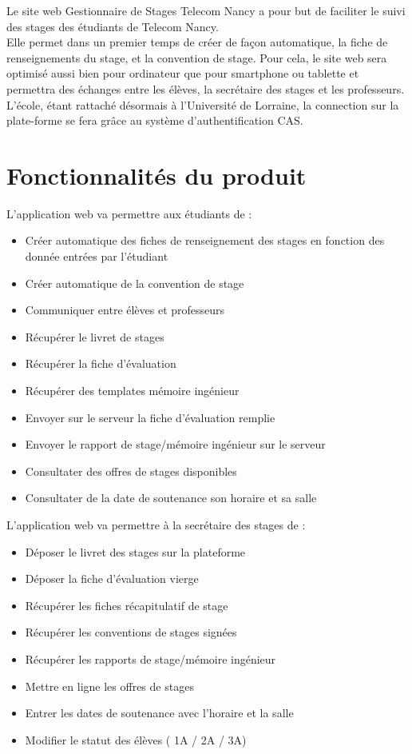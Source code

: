 \documentclass{scrreprt}
\begin{document}
\hspace{1cm}Le site web Gestionnaire de Stages Telecom Nancy a pour but de faciliter le suivi des stages des étudiants de Telecom Nancy.\\

\hspace{0.6cm}Elle permet dans un premier temps de créer de façon automatique, la fiche de renseignements du stage, et la convention de stage. Pour cela, le site web sera optimisé aussi bien pour ordinateur que pour smartphone ou tablette et permettra des échanges entre les élèves, la secrétaire des stages et les professeurs. L'école, étant rattaché désormais à l'Université de Lorraine, la connection sur la plate-forme se fera grâce au système d'authentification CAS.

\section{Fonctionnalités du produit}
L'application web va permettre aux étudiants de :
\begin{itemize}[label=\textbullet]
	\item Créer automatique des fiches de renseignement des stages en fonction des donnée entrées par l'étudiant
	\item Créer automatique de la convention de stage
	\item Communiquer entre élèves et professeurs
	\item Récupérer le livret de stages
	\item Récupérer la fiche d'évaluation
	\item Récupérer des templates mémoire ingénieur
	\item Envoyer sur le serveur la fiche d'évaluation remplie
	\item Envoyer le rapport de stage/mémoire ingénieur sur le serveur
	\item Consultater des offres de stages disponibles
	\item Consultater de la date de soutenance son horaire et sa salle
\end{itemize}

L'application web va permettre à la secrétaire des stages de :
\begin{itemize}[label=\textbullet]
	\item Déposer le livret des stages sur la plateforme
	\item Déposer la fiche d'évaluation vierge
	\item Récupérer les fiches récapitulatif de stage
	\item Récupérer les conventions de stages signées
	\item Récupérer les rapports de stage/mémoire ingénieur
	\item Mettre en ligne les offres de stages
	\item Entrer les dates de soutenance avec l'horaire et la salle
	\item Modifier le statut des élèves ( 1A / 2A / 3A)
	
\end{itemize}
	
\end{document}
